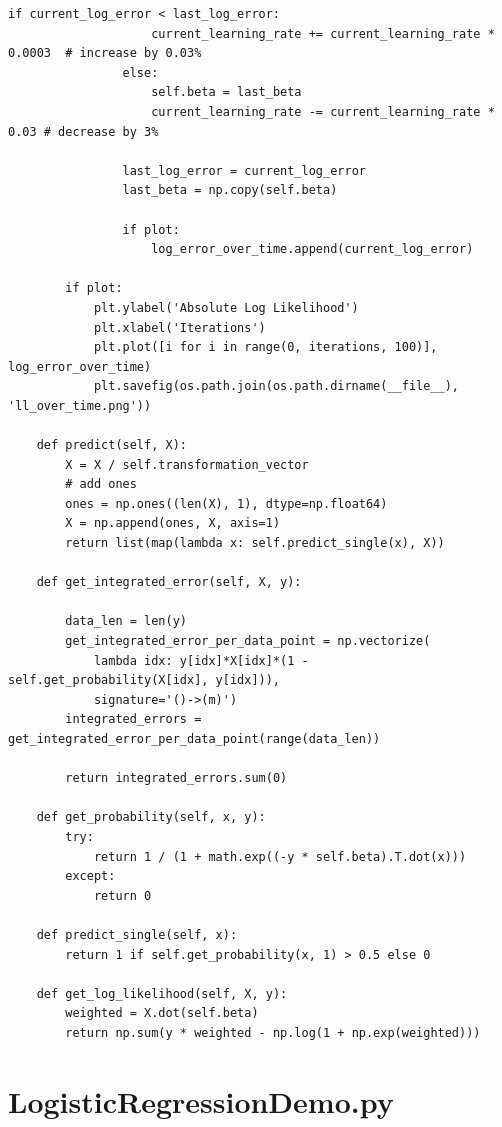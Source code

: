 \begin{lstlisting}[style=py]
                if current_log_error < last_log_error:
                    current_learning_rate += current_learning_rate * 0.0003  # increase by 0.03%
                else:
                    self.beta = last_beta
                    current_learning_rate -= current_learning_rate * 0.03 # decrease by 3%

                last_log_error = current_log_error
                last_beta = np.copy(self.beta)

                if plot:
                    log_error_over_time.append(current_log_error)

        if plot:
            plt.ylabel('Absolute Log Likelihood')
            plt.xlabel('Iterations')
            plt.plot([i for i in range(0, iterations, 100)], log_error_over_time)
            plt.savefig(os.path.join(os.path.dirname(__file__), 'll_over_time.png'))

    def predict(self, X):
        X = X / self.transformation_vector
        # add ones
        ones = np.ones((len(X), 1), dtype=np.float64)
        X = np.append(ones, X, axis=1)
        return list(map(lambda x: self.predict_single(x), X))

    def get_integrated_error(self, X, y):

        data_len = len(y)
        get_integrated_error_per_data_point = np.vectorize(
            lambda idx: y[idx]*X[idx]*(1 - self.get_probability(X[idx], y[idx])),
            signature='()->(m)')
        integrated_errors = get_integrated_error_per_data_point(range(data_len))

        return integrated_errors.sum(0)

    def get_probability(self, x, y):
        try:
            return 1 / (1 + math.exp((-y * self.beta).T.dot(x)))
        except:
            return 0

    def predict_single(self, x):
        return 1 if self.get_probability(x, 1) > 0.5 else 0

    def get_log_likelihood(self, X, y):
        weighted = X.dot(self.beta)
        return np.sum(y * weighted - np.log(1 + np.exp(weighted)))

\end{lstlisting}

\section*{LogisticRegressionDemo.py}

